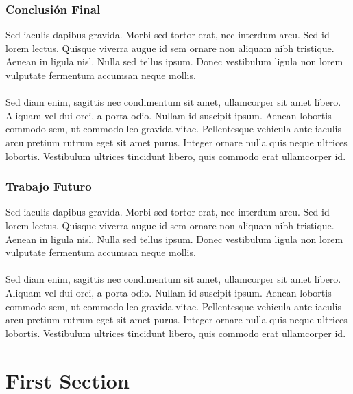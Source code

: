 \documentclass{beamer}
\begin{document}

\begin{frame}
\frametitle{Conclusión Final}
Sed iaculis dapibus gravida. Morbi sed tortor erat, nec interdum arcu. Sed id lorem lectus. Quisque viverra augue id sem ornare non aliquam nibh tristique. Aenean in ligula nisl. Nulla sed tellus ipsum. Donec vestibulum ligula non lorem vulputate fermentum accumsan neque mollis.\\~\\

Sed diam enim, sagittis nec condimentum sit amet, ullamcorper sit amet libero. Aliquam vel dui orci, a porta odio. Nullam id suscipit ipsum. Aenean lobortis commodo sem, ut commodo leo gravida vitae. Pellentesque vehicula ante iaculis arcu pretium rutrum eget sit amet purus. Integer ornare nulla quis neque ultrices lobortis. Vestibulum ultrices tincidunt libero, quis commodo erat ullamcorper id.
\end{frame}


\begin{frame}
\frametitle{Trabajo Futuro}
Sed iaculis dapibus gravida. Morbi sed tortor erat, nec interdum arcu. Sed id lorem lectus. Quisque viverra augue id sem ornare non aliquam nibh tristique. Aenean in ligula nisl. Nulla sed tellus ipsum. Donec vestibulum ligula non lorem vulputate fermentum accumsan neque mollis.\\~\\

Sed diam enim, sagittis nec condimentum sit amet, ullamcorper sit amet libero. Aliquam vel dui orci, a porta odio. Nullam id suscipit ipsum. Aenean lobortis commodo sem, ut commodo leo gravida vitae. Pellentesque vehicula ante iaculis arcu pretium rutrum eget sit amet purus. Integer ornare nulla quis neque ultrices lobortis. Vestibulum ultrices tincidunt libero, quis commodo erat ullamcorper id.
\end{frame}

\section{First Section} %
\end{document}
